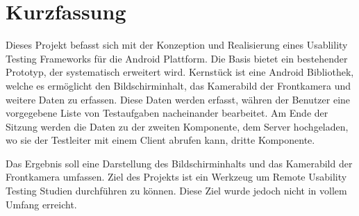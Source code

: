 \setcounter{page}{1}
\onehalfspacing


\section*{Kurzfassung}
Dieses Projekt befasst sich mit der Konzeption und Realisierung eines Usablility Testing Frameworks für die Android Plattform.
Die Basis bietet ein bestehender Prototyp, der systematisch erweitert wird.
Kernstück ist eine Android Bibliothek, welche es ermöglicht den Bildschirminhalt, das Kamerabild der Frontkamera und weitere Daten zu erfassen.
Diese Daten werden erfasst, währen der Benutzer eine vorgegebene Liste von Testaufgaben nacheinander bearbeitet.
Am Ende der Sitzung werden die Daten zu der zweiten Komponente, dem Server hochgeladen, wo sie der Testleiter mit einem Client abrufen kann, dritte Komponente.

Das Ergebnis soll eine Darstellung des Bildschirminhalts und das Kamerabild der Frontkamera umfassen.
Ziel des Projekts ist ein Werkzeug um Remote Usability Testing Studien durchführen zu können.
Diese Ziel wurde jedoch nicht in vollem Umfang erreicht.


